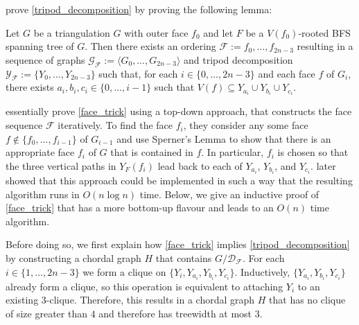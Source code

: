\documentclass{patmorin}
\begin{document}

\citet{dujmovic.joret.ea:planar} prove \cref{tripod_decomposition} by proving the following lemma:

\begin{lem}\label{face_trick}
  Let $G$ be a triangulation $G$ with outer face $f_0$ and let $F$ be a $V(f_0)$-rooted BFS spanning tree of $G$.  Then there exists an ordering $\mathcal{F}:=f_0,\ldots,f_{2n-3}$ resulting in a sequence of graphs $\mathcal{G_F}:=\langle G_0,\ldots,G_{2n-3}\rangle$ and tripod decomposition $\mathcal{Y_F}:=\{Y_0,\ldots,Y_{2n-3}\}$ such that, for each $i\in\{0,\ldots,2n-3\}$ and each face $f$ of $G_i$, there exists $a_i,b_i,c_i\in\{0,\ldots,i-1\}$ such that $V(f)\subseteq Y_{a_i}\cup Y_{b_i}\cup Y_{c_i}$.
\end{lem}

\citet{dujmovic.joret.ea:planar} essentially prove \cref{face_trick} using a top-down approach, that constructs the face sequence $\mathcal{F}$ iteratively.  To find the face $f_i$, they consider any some face $f\not\in\{f_0,\ldots,f_{i-1}\}$ of $G_{i-1}$ and use Sperner's Lemma to show that there is an appropriate face $f_i$ of $G$ that is contained in $f$. In particular, $f_i$ is chosen so that the three vertical paths in $Y_F(f_i)$ lead back to each of $Y_{a_i}$, $Y_{b_i}$, and $Y_{c_i}$. \citet{morin:fast} later showed that this approach could be implemented in such a way that the resulting algorithm runs in $O(n\log n)$ time.  Below, we give an inductive proof of \cref{face_trick} that has a more bottom-up flavour and leads to an $O(n)$ time algorithm.

Before doing so, we first explain how \cref{face_trick} implies \cref{tripod_decomposition} by constructing a chordal graph $H$ that contains $G/\mathcal{D_F}$.  For each $i\in\{1,\ldots,2n-3\}$ we form a clique on  $\{Y_i,Y_{a_i},Y_{b_i},Y_{c_i}\}$.  Inductively, $\{Y_{a_i},Y_{b_i},Y_{c_i}\}$ already form a clique, so this operation is equivalent to attaching $Y_i$ to an existing $3$-clique.  Therefore, this results in a chordal graph $H$ that has no clique of size greater than $4$ and therefore has treewidth at most $3$.
\end{document}

